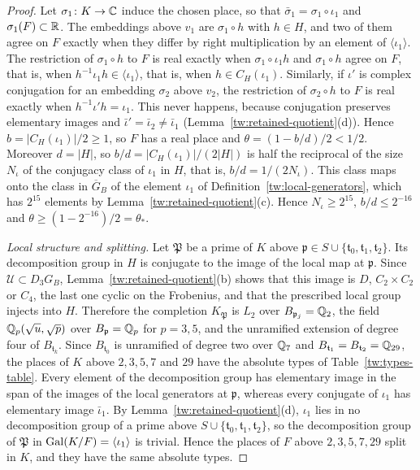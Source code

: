 \begin{proof}
Let $\sigma_1\colon K\to\mathbb C$
induce the chosen place, so that $\bar\sigma_1=\sigma_1\circ\iota_1$ and
$\sigma_1(F)\subset\mathbb R$. The embeddings above $v_1$ are $\sigma_1\circ h$ with
$h\in H$, and two of them agree on $F$ exactly when they differ by right
multiplication by an element of $\langle\iota_1\rangle$. The restriction of
$\sigma_1\circ h$ to $F$ is real exactly when $\sigma_1\circ\iota_1h$ and
$\sigma_1\circ h$ agree on $F$, that is, when
$h^{-1}\iota_1h\in\langle\iota_1\rangle$, that is, when
$h\in C_H(\iota_1)$. Similarly, if $\iota'$ is complex conjugation for an
embedding $\sigma_2$ above $v_2$, the restriction of $\sigma_2\circ h$ to $F$
is real exactly when $h^{-1}\iota'h=\iota_1$. This never happens, because
conjugation preserves elementary images and $\bar\iota'=\bar\iota_2\ne\bar\iota_1$
(Lemma~\ref{tw:retained-quotient}(d)). Hence $b=|C_H(\iota_1)|/2\ge1$, so $F$
has a real place and $\theta=(1-b/d)/2<1/2$. Moreover $d=|H|$, so
$b/d=|C_H(\iota_1)|/(2|H|)$ is half the reciprocal of the size $N_\iota$ of
the conjugacy class of $\iota_1$ in $H$, that is, $b/d=1/(2N_\iota)$. This
class maps onto the class in $\overline G_B$ of the element $\iota_1$ of
Definition~\ref{tw:local-generators}, which has $2^{15}$
elements by Lemma~\ref{tw:retained-quotient}(c). Hence $N_\iota\ge2^{15}$,
$b/d\le2^{-16}$ and $\theta\ge(1-2^{-16})/2=\theta_*$.

\emph{Local structure and splitting.} Let $\mathfrak P$ be a prime of $K$
above $\mathfrak p\in S\cup\{\mathfrak t_0,\mathfrak t_1,\mathfrak t_2\}$. Its
decomposition group in $H$ is conjugate to the image of the local map at
$\mathfrak p$. Since $\mathcal U\subset D_3G_B$, Lemma~\ref{tw:retained-quotient}(b)
shows that this image is $D$, $C_2\times C_2$ or $C_4$, the last one cyclic on
the Frobenius, and that the prescribed local group injects into $H$.
Therefore the completion $K_{\mathfrak P}$ is $L_2$ over
$B_{\mathfrak p_j}=\mathbb Q_2$, the field $\mathbb Q_p(\sqrt u,\sqrt p)$ over
$B_{\mathfrak p}=\mathbb Q_p$ for $p=3,5$, and the unramified extension of degree
four of $B_{\mathfrak t_k}$. Since $B_{\mathfrak t_0}$ is unramified of
degree two over $\mathbb Q_7$ and $B_{\mathfrak t_1}=B_{\mathfrak t_2}=\mathbb Q_{29}$, the
places of $K$ above $2,3,5,7$ and $29$ have the absolute types of
Table~\ref{tw:types-table}. Every element of
the decomposition group has elementary image in the span of the images of the
local generators at $\mathfrak p$, whereas every conjugate of $\iota_1$ has
elementary image $\bar\iota_1$. By Lemma~\ref{tw:retained-quotient}(d),
$\iota_1$ lies in no decomposition group of a prime above
$S\cup\{\mathfrak t_0,\mathfrak t_1,\mathfrak t_2\}$, so the decomposition
group of $\mathfrak P$ in $\operatorname{Gal}(K/F)=\langle\iota_1\rangle$ is trivial. Hence
the places of $F$ above $2,3,5,7,29$ split in $K$, and they have the same
absolute types.


\end{proof}
